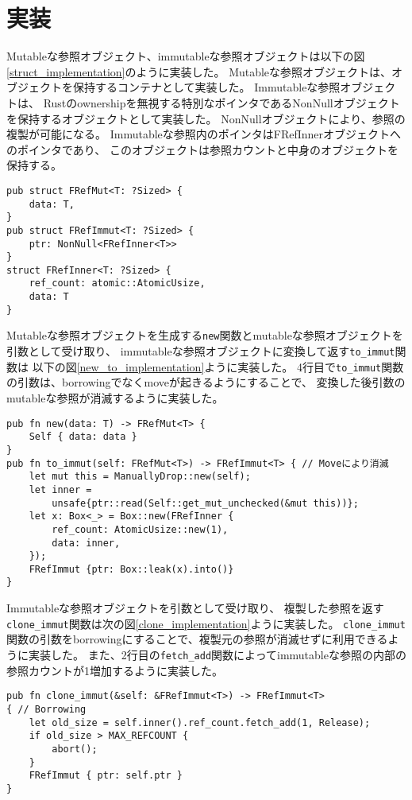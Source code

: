 \documentclass{sumiilab-paper}
\theoremstyle{mystyle}
\numberwithin{definition}{chapter} %
\begin{document}
\section{実装}
Mutableな参照オブジェクト、immutableな参照オブジェクトは以下の図\ref{struct_implementation}のように実装した。
Mutableな参照オブジェクトは、オブジェクトを保持するコンテナとして実装した。
Immutableな参照オブジェクトは、
Rustのownershipを無視する特別なポインタであるNonNullオブジェクトを保持するオブジェクトとして実装した。
NonNullオブジェクトにより、参照の複製が可能になる。
Immutableな参照内のポインタはFRefInnerオブジェクトへのポインタであり、
このオブジェクトは参照カウントと中身のオブジェクトを保持する。
\begin{lstlisting}[caption=新たな参照オブジェクトの実装, label=struct_implementation, captionpos=b]
pub struct FRefMut<T: ?Sized> {
    data: T,
}
pub struct FRefImmut<T: ?Sized> {
    ptr: NonNull<FRefInner<T>>
}
struct FRefInner<T: ?Sized> {
    ref_count: atomic::AtomicUsize,
    data: T
}
\end{lstlisting}

Mutableな参照オブジェクトを生成する\texttt{new}関数とmutableな参照オブジェクトを引数として受け取り、
immutableな参照オブジェクトに変換して返す\texttt{to\_immut}関数は
以下の図\ref{new_to_implementation}ように実装した。
4行目で\texttt{to\_immut}関数の引数は、borrowingでなくmoveが起きるようにすることで、
変換した後引数のmutableな参照が消滅するように実装した。
\begin{lstlisting}[caption=関数newと関数to\_immutの実装, label=new_to_implementation, captionpos=b]
pub fn new(data: T) -> FRefMut<T> {
    Self { data: data }
}
pub fn to_immut(self: FRefMut<T>) -> FRefImmut<T> { // Moveにより消滅
    let mut this = ManuallyDrop::new(self);
    let inner =
        unsafe{ptr::read(Self::get_mut_unchecked(&mut this))};
    let x: Box<_> = Box::new(FRefInner {
        ref_count: AtomicUsize::new(1),
        data: inner,
    });
    FRefImmut {ptr: Box::leak(x).into()}
}
\end{lstlisting}

Immutableな参照オブジェクトを引数として受け取り、
複製した参照を返す\texttt{clone\_immut}関数は次の図\ref{clone_implementation}ように実装した。
\texttt{clone\_immut}関数の引数をborrowingにすることで、複製元の参照が消滅せずに利用できるように実装した。
また、2行目の\texttt{fetch\_add}関数によってimmutableな参照の内部の参照カウントが1増加するように実装した。
\begin{lstlisting}[caption=関数clone\_immutの実装, label=clone_implementation, captionpos=b]
pub fn clone_immut(&self: &FRefImmut<T>) -> FRefImmut<T>
{ // Borrowing
    let old_size = self.inner().ref_count.fetch_add(1, Release);
    if old_size > MAX_REFCOUNT {
        abort();
    }
    FRefImmut { ptr: self.ptr }
}
\end{lstlisting}
\end{document}
